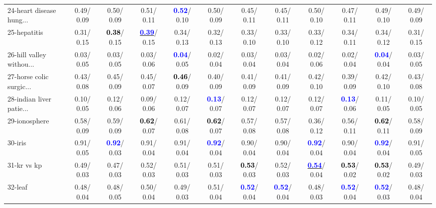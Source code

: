 \begin{table}[h]
\begin{center}
{\begin{tabular}{lc|c|c|c|c|c|c|c|c|c|c}
24-heart disease hung... &   0.49/  0.09 &   0.50/  0.09 &   0.51/  0.11 & \textcolor{blue}{\textbf{  0.52}}/  0.10 &   0.50/  0.09 &   0.45/  0.11 &   0.45/  0.11 &   0.50/  0.10 &   0.47/  0.11 &   0.49/  0.10 &   0.49/  0.09 \\
25-hepatitis &   0.31/  0.15 & \textcolor{black}{\textbf{  0.38}}/  0.15 & \underline{\textcolor{blue}{\textbf{  0.39}}}/  0.15 &   0.34/  0.13 &   0.32/  0.13 &   0.33/  0.10 &   0.33/  0.10 &   0.33/  0.12 &   0.34/  0.11 &   0.34/  0.12 &   0.31/  0.15 \\
26-hill valley withou... &   0.03/  0.05 &   0.03/  0.05 &   0.03/  0.06 & \textcolor{blue}{\textbf{  0.04}}/  0.05 &   0.02/  0.04 &   0.03/  0.04 &   0.03/  0.04 &   0.02/  0.06 &   0.02/  0.04 & \textcolor{blue}{\textbf{  0.04}}/  0.04 &   0.03/  0.05 \\
27-horse colic surgic... &   0.43/  0.08 &   0.45/  0.09 &   0.45/  0.07 & \textcolor{black}{\textbf{  0.46}}/  0.09 &   0.40/  0.09 &   0.41/  0.09 &   0.41/  0.09 &   0.42/  0.10 &   0.39/  0.09 &   0.42/  0.10 &   0.43/  0.08 \\
28-indian liver patie... &   0.10/  0.05 &   0.12/  0.06 &   0.09/  0.06 &   0.12/  0.07 & \textcolor{blue}{\textbf{  0.13}}/  0.07 &   0.12/  0.07 &   0.12/  0.07 &   0.12/  0.07 & \textcolor{blue}{\textbf{  0.13}}/  0.06 &   0.11/  0.05 &   0.10/  0.05 \\ \hline
29-ionosphere &   0.58/  0.09 &   0.59/  0.09 & \textcolor{black}{\textbf{  0.62}}/  0.07 &   0.61/  0.08 & \textcolor{black}{\textbf{  0.62}}/  0.07 &   0.57/  0.08 &   0.57/  0.08 &   0.36/  0.12 &   0.56/  0.11 & \textcolor{black}{\textbf{  0.62}}/  0.11 &   0.58/  0.09 \\
30-iris &   0.91/  0.05 & \textcolor{blue}{\textbf{  0.92}}/  0.03 &   0.91/  0.04 &   0.91/  0.04 & \textcolor{blue}{\textbf{  0.92}}/  0.04 &   0.90/  0.04 &   0.90/  0.04 & \textcolor{blue}{\textbf{  0.92}}/  0.04 &   0.90/  0.04 & \textcolor{blue}{\textbf{  0.92}}/  0.04 &   0.91/  0.05 \\
31-kr vs kp &   0.49/  0.03 &   0.47/  0.03 &   0.52/  0.03 &   0.51/  0.03 &   0.51/  0.03 & \textcolor{black}{\textbf{  0.53}}/  0.03 &   0.52/  0.03 & \underline{\textcolor{blue}{\textbf{  0.54}}}/  0.04 & \textcolor{black}{\textbf{  0.53}}/  0.02 & \textcolor{black}{\textbf{  0.53}}/  0.02 &   0.49/  0.03 \\
32-leaf &   0.48/  0.04 &   0.48/  0.05 &   0.50/  0.04 &   0.49/  0.03 &   0.51/  0.04 & \textcolor{blue}{\textbf{  0.52}}/  0.04 & \textcolor{blue}{\textbf{  0.52}}/  0.04 &   0.48/  0.03 & \textcolor{blue}{\textbf{  0.52}}/  0.04 & \textcolor{blue}{\textbf{  0.52}}/  0.03 &   0.48/  0.04 \\\end{tabular}}\label{stratsALCKappa0a5NNaRedux}
\end{center}
\end{table}
